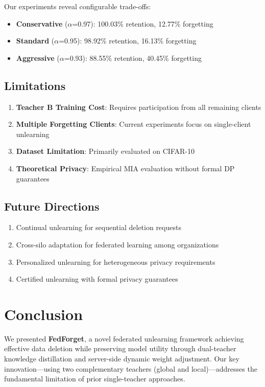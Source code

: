 \documentclass[10pt,twocolumn]{article}
\begin{document}
Our experiments reveal configurable trade-offs:

\begin{itemize}
\item \textbf{Conservative} ($\alpha$=0.97): 100.03\% retention, 12.77\% forgetting
\item \textbf{Standard} ($\alpha$=0.95): 98.92\% retention, 16.13\% forgetting
\item \textbf{Aggressive} ($\alpha$=0.93): 88.55\% retention, 40.45\% forgetting
\end{itemize}

\subsection{Limitations}

\begin{enumerate}
\item \textbf{Teacher B Training Cost}: Requires participation from all remaining clients
\item \textbf{Multiple Forgetting Clients}: Current experiments focus on single-client unlearning
\item \textbf{Dataset Limitation}: Primarily evaluated on CIFAR-10
\item \textbf{Theoretical Privacy}: Empirical MIA evaluation without formal DP guarantees
\end{enumerate}

\subsection{Future Directions}

\begin{enumerate}
\item Continual unlearning for sequential deletion requests
\item Cross-silo adaptation for federated learning among organizations
\item Personalized unlearning for heterogeneous privacy requirements
\item Certified unlearning with formal privacy guarantees
\end{enumerate}

\section{Conclusion}

We presented \textbf{FedForget}, a novel federated unlearning framework achieving effective data deletion while preserving model utility through dual-teacher knowledge distillation and server-side dynamic weight adjustment. Our key innovation---using two complementary teachers (global and local)---addresses the fundamental limitation of prior single-teacher approaches.
\end{document}
